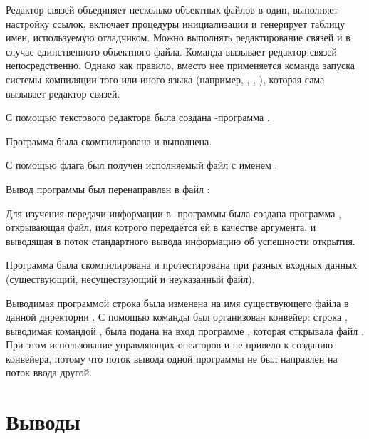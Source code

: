 Редактор связей объединяет несколько объектных файлов в один, выполняет настройку ссылок, включает процедуры инициализации и генерирует таблицу имен, используемую отладчиком. Можно выполнять редактирование связей и в случае единственного объектного файла. Команда  вызывает редактор связей непосредственно. Однако как правило, вместо нее применяется команда запуска системы компиляции того или иного языка (например, , , ), которая сама вызывает редактор связей.

С помощью текстового редактора  была создана -программа .


Программа была скомпилирована и выполнена.


С помощью флага  был получен исполняемый файл с именем .


\newpage

Вывод программы был перенаправлен в файл :


Для изучения передачи информации в -программы была создана программа , открывающая файл, имя котрого передается ей в качестве аргумента, и выводящая в поток стандартного вывода информацию об успешности открытия.


Программа была скомпилирована и протестирована при разных входных данных (существующий, несуществующий и неуказанный файл).


Выводимая программой  строка была изменена на имя существующего файла в данной директории . С помощью команды  был организован конвейер: строка , выводимая командой , была подана на вход программе , которая открывала файл . При этом использование управляющих опеаторов \code{||} и \code{\&\&} не привело к созданию конвейера, потому что поток вывода одной программы не был направлен на поток ввода другой.

\newpage
 


\section{Выводы}

